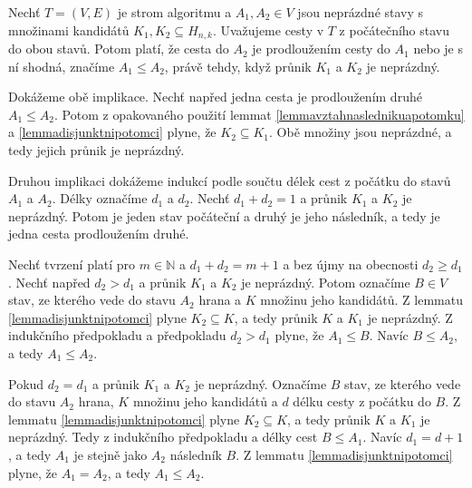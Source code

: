 \begin{lemma}\label{lemmaprunikacestastromalg}
    Nechť $T = (V,E)$ je strom algoritmu a $A_1, A_2 \in V$ jsou neprázdné stavy s množinami kandidátů $K_1, K_2 \subseteq H_{n,k}$. Uvažujeme cesty v $T$ z počátečního stavu do obou stavů. Potom platí, že cesta do $A_2$ je prodloužením cesty do $A_1$ nebo je s ní shodná, značíme $A_1 \leq A_2$, právě tehdy, když průnik $K_1$ a $K_2$ je neprázdný. 
\end{lemma}
\begin{dukaz}
    Dokážeme obě implikace. Nechť napřed jedna cesta je prodloužením druhé $A_1 \leq A_2$. Potom z opakovaného použití lemmat \ref{lemmavztahnaslednikuapotomku} a \ref{lemmadisjunktnipotomci} plyne, že $K_2 \subseteq K_1$. Obě množiny jsou neprázdné, a tedy jejich průnik je neprázdný. 

    Druhou implikaci dokážeme indukcí podle součtu délek cest z počátku do stavů $A_1$ a $A_2$. Délky označíme $d_1$ a $d_2$. Nechť $d_1 + d_2 = 1$ a průnik $K_1$ a $K_2$ je neprázdný. Potom je jeden stav počáteční a druhý je jeho následník, a tedy je jedna cesta prodloužením druhé.


    Nechť tvrzení platí pro $m \in \mathbb{N}$ a $d_1 + d_2 = m+1$ a bez újmy na obecnosti $d_2 \geq d_1$. Nechť napřed $d_2 > d_1$ a průnik $K_1$ a $K_2$ je neprázdný. Potom označíme $B \in V$ stav, ze kterého vede do stavu $A_2$ hrana a $K$ množinu jeho kandidátů. Z lemmatu \ref{lemmadisjunktnipotomci} plyne $K_2 \subseteq K$, a tedy průnik $K$ a $K_1$ je neprázdný. Z indukčního předpokladu a předpokladu $d_2 > d_1$ plyne, že $A_1 \leq B$. Navíc $B\leq A_2$, a tedy $A_1 \leq A_2$. 

    Pokud $d_2 = d_1$ a průnik $K_1$ a $K_2$ je neprázdný. Označíme $B$ stav, ze kterého vede do stavu $A_2$ hrana, $K$ množinu jeho kandidátů a $d$ délku cesty z počátku do $B$. Z lemmatu \ref{lemmadisjunktnipotomci} plyne $K_2 \subseteq K$, a tedy průnik $K$ a $K_1$ je neprázdný. Tedy z indukčního předpokladu a délky cest $B \leq A_1$. Navíc $d_1 = d+1$, a tedy $A_1$ je stejně jako $A_2$ následník $B$. Z lemmatu \ref{lemmadisjunktnipotomci} plyne, že $A_1 = A_2$, a tedy $A_1 \leq A_2$. 
\end{dukaz}


